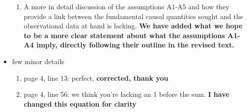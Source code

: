 \documentclass[11pt]{article} %
\begin{document}
\begin{itemize}
\begin{enumerate}
 \item A more in detail discussion of the assumptions A1-A5 and how they provide a link between the fundamental causal quantities sought and the observational data at hand is lacking.
 \textbf{We have added what we hope to be a more clear statement about what the assumptions A1-A4 imply, directly following their outline in the revised text.}
\end{enumerate}
\item  few minor details
\begin{enumerate}
 \item page 4, line 13: perfect, \textbf{corrected, thank you}
 \item page 4, line 56: we think you’re lacking an 1 before the sum. \textbf{I have changed this equation for clarity} 
\end{enumerate}
\end{itemize}
\end{document}
